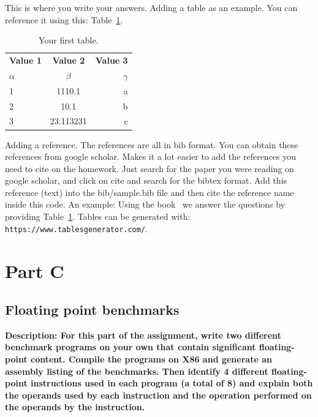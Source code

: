 This is where you write your answers. Adding a table as an example. You can reference it using this: Table~\ref{tab:example}.

\begin{table}[!htbp]
  \begin{center}
    \caption{Your first table.}
    \label{tab:example}
    \begin{tabular}{l|c|r} %
      \textbf{Value 1} & \textbf{Value 2} & \textbf{Value 3}\\
      $\alpha$ & $\beta$ & $\gamma$ \\
      \hline
      1 & 1110.1 & a\\
      2 & 10.1 & b\\
      3 & 23.113231 & c\\
    \end{tabular}
  \end{center}
\end{table}

Adding a reference. The references are all in bib format. You can obtain these references from google scholar. Makes it a lot easier to add the references you need to cite on the homework. Just search for the paper you were reading on google scholar, and click on cite and search for the bibtex format. Add this reference (text) into the bib/sample.bib file and then cite the reference name inside this code. An example: Using the book~\cite{book} we answer the questions by providing Table~\ref{tab:example}. Tables can be generated with:
\lstinline{https://www.tablesgenerator.com/}.


\newpage



\section{Part C}

\subsection{Floating point benchmarks}
\textbf{Description: For	this	part	of	the	assignment,	write	two	different	benchmark	programs	on	your	
own that	contain significant	floating-point	content.		Compile	the	programs on	X86	
and	generate	an	assembly	listing	of the	benchmarks.		Then	identify	4 different	
floating-point	instructions	used	in	each program (a	total	of	8) and	explain	both	the	
operands	used	by	each	instruction	and	the	operation performed	on	the	operands	by	
the	instruction.}

